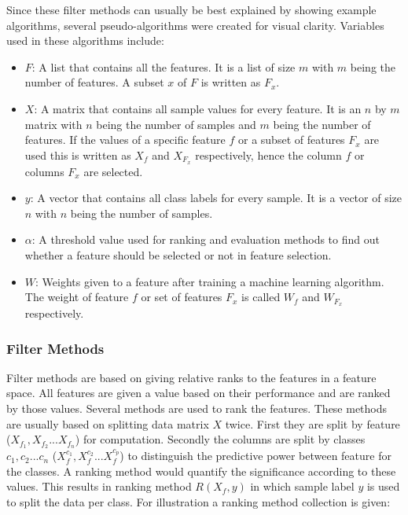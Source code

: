 	Since these filter methods can usually be best explained by showing example algorithms, several pseudo-algorithms were created for visual clarity. Variables used in these algorithms include:
	\begin{itemize}
		\item \textit{$F$}: A list that contains all the features. It is a list of size $m$ with $m$ being the number of features. A subset $x$ of $F$ is written as $F_x$.
		\item \textit{$X$}: A matrix that contains all sample values for every feature. It is an $n$ by $m$ matrix with $n$ being the number of samples and $m$ being the number of features. If the values of a specific feature $f$ or a subset of features $F_x$ are used this is written as $X_f$ and $X_{F_x}$ respectively, hence the column $f$ or columns $F_x$ are selected.
		\item \textit{$y$}: A vector that contains all class labels for every sample. It is a vector of size $n$ with $n$ being the number of samples.
		\item \textit{$\alpha$}: A threshold value used for ranking and evaluation methods to find out whether a feature should be selected or not in feature selection.
		\item \textit{$W$}: Weights given to a feature after training a machine learning algorithm. The weight of feature $f$ or set of features $F_x$ is called $W_f$ and $W_{F_x}$ respectively.
	\end{itemize}
	
	\subsubsection{Filter Methods}
	\label{subsec:FilterMethods}
	
	Filter methods are based on giving relative ranks to the features in a feature space. All features are given a value based on their performance and are ranked by those values\cite{Duch2006, saeys2007review}. Several methods are used to rank the features. These methods are usually based on splitting data matrix $X$ twice. First they are split by feature ($X_{f_1}, X_{f_2} ... X_{f_n}$) for computation. Secondly the columns are split by classes $c_1, c_2 ... c_n$ ($X_{f}^{c_1}, X_{f}^{c_2} ... X_{f}^{c_p}$) to distinguish the predictive power between feature for the classes. A ranking method would quantify the significance according to these values. This results in ranking method $R(X_f, y)$ in which sample label $y$ is used to split the data per class. For illustration a ranking method collection is given:
	
